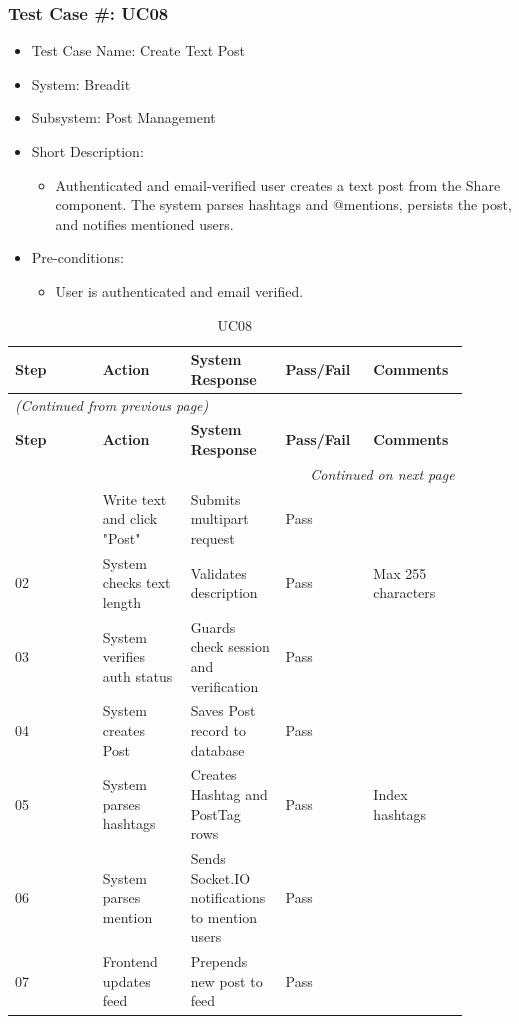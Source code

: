 \subsubsection{Test Case \#: UC08}
\begin{itemize}
  \item Test Case Name: Create Text Post
  \item System: Breadit
  \item Subsystem: Post Management
  \item Short Description:
\begin{itemize}
  \item Authenticated and email-verified user creates a text post from the Share component. The system parses hashtags and @mentions, persists the post, and notifies mentioned users.
\end{itemize}
  \item Pre-conditions:
\begin{itemize}
  \item User is authenticated and email verified.
\end{itemize}
\end{itemize}

\begin{longtable}{|p{0.18\linewidth}|p{0.18\linewidth}|p{0.18\linewidth}|p{0.18\linewidth}|p{0.18\linewidth}|}
\caption{UC08} \label{tab:32} \\
\hline
\textbf{Step} & \textbf{Action} & \textbf{System Response} & \textbf{Pass/Fail} & \textbf{Comments} \\
\hline
\endfirsthead
\multicolumn{5}{l}{\textit{(Continued from previous page)}} \\
\hline
\textbf{Step} & \textbf{Action} & \textbf{System Response} & \textbf{Pass/Fail} & \textbf{Comments} \\
\hline
\endhead
\hline \multicolumn{5}{r}{\textit{Continued on next page}} \\
\endfoot
\hline
\endlastfoot
01 & Write text and click "Post" & Submits multipart request & Pass &  \\
\hline
02 & System checks text length & Validates description & Pass & Max 255 characters \\
\hline
03 & System verifies auth status & Guards check session and verification & Pass &  \\
\hline
04 & System creates Post & Saves Post record to database & Pass &  \\
\hline
05 & System parses hashtags & Creates Hashtag and PostTag rows & Pass & Index hashtags \\
\hline
06 & System parses mention & Sends Socket.IO notifications to mention users & Pass &  \\
\hline
07 & Frontend updates feed & Prepends new post to feed & Pass &  \\
\hline
\end{longtable}


